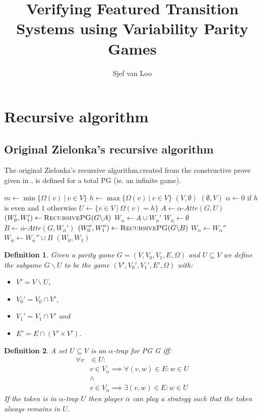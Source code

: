 \documentclass[]{article}
\title{Verifying Featured Transition Systems using Variability Parity Games}
\author{Sjef van Loo}
\newtheorem{definition}{Definition}[section]
\begin{document}
\section{Recursive algorithm}
\subsection{Original Zielonka's recursive algorithm}
The original Zielonka's recursive algorithm,created from the constructive prove given in \cite{ZIELONKA1998135}, is defined for a total PG (ie. an infinite game).
\begin{algorithm}[h]
	\caption{$\textsc{RecursivePG}(\textit{PG } G = (V,V_0,V_1, E, \Omega)$}
	\begin{algorithmic}[1]
		\State $m \gets \min\{ \Omega(v)\ |\ v \in V\}$
		\State $h \gets\max\{ \Omega(v)\ |\ v \in V\}$
		\State \Return $(V,\emptyset)$
		\Else
		\State \Return $(\emptyset, V)$
		\EndIf
		\EndIf
		\State $\alpha \gets 0$ if $h$ is even and $1$ otherwise
		\State $U \gets \{v \in V\ |\ \Omega(v) = h\}$
		\State $A \gets \alpha\textit{-Attr}(G, U)$
		\State $(W_0', W_1') \gets \textsc{RecursivePG}(G \backslash A)$
		\State $W_\alpha \gets A \cup W_\alpha'$
		\State $W_{\overline{\alpha}} \gets \emptyset$
		\Else
		\State $B \gets \overline{\alpha}\textit{-Attr}(G,W_{\overline{\alpha}}')$
		\State $(W_0'', W_1'') \gets \textsc{RecursivePG}(G \backslash B)$
		\State $W_\alpha \gets W_\alpha''$
		\State $W_{\overline{\alpha}} \gets W_{\overline{\alpha}}'' \cup B$
		\EndIf
		\State \Return $(W_0, W_1)$
	\end{algorithmic}
\end{algorithm}
\begin{definition}\cite{ZIELONKA1998135}
	\label{def_org_subgame}
	Given a parity game $G = (V,V_0,V_1, E,\Omega)$ and $U \subseteq V$ we define the subgame $G \backslash U$ to be the game $(V', V_0', V_1', E', \Omega)$ with:
	\begin{itemize}
		\item $V' = V \backslash U$,
		\item $V_0' = V_0 \cap V'$,
		\item $V_1' = V_1 \cap V'$ and
		\item $E' = E \cap (V' \times V')$.
	\end{itemize}
\end{definition}

\begin{definition}\cite{ZIELONKA1998135}
	\label{def_trap}
	A set $U \subseteq V$ is an $\alpha$-trap for PG G iff:
	\begin{align*}
	\forall v &\in U:\\
	&v \in V_\alpha \implies \forall(v,w) \in E : w \in U\\
	&\wedge\\
	&v \in V_{\overline{\alpha}} \implies \exists (v,w) \in E : w \in U
	\end{align*}
	If the token is in $\alpha$-trap $U$ then player $\overline{\alpha}$ can play a strategy such that the token always remains in $U$.
\end{definition}
\end{document}
